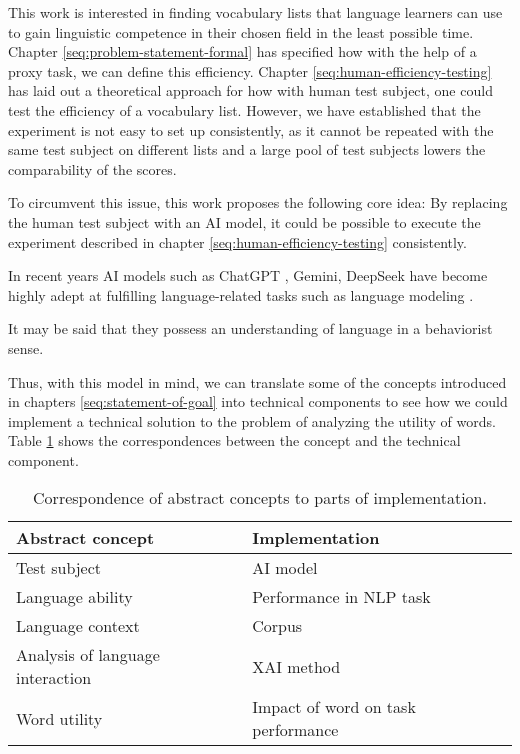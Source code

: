 This work is interested in finding vocabulary lists that language learners can use to gain linguistic competence in their chosen field in the least possible time.
Chapter \ref{seq:problem-statement-formal} has specified how with the help of a proxy task, we can define this efficiency.
Chapter \ref{seq:human-efficiency-testing} has laid out a theoretical approach for how with human test subject, one could test the efficiency of a vocabulary list.
However, we have established that the experiment is not easy to set up consistently, as it cannot be repeated with the same test subject on different lists and a large pool of test subjects lowers the comparability of the scores.

To circumvent this issue, this work proposes the following core idea:
By replacing the human test subject with an AI model, it could be possible to execute the experiment described in chapter \ref{seq:human-efficiency-testing} consistently.

In recent years AI models such as ChatGPT , Gemini, DeepSeek have become highly adept at fulfilling language-related tasks such as language modeling .

It may be said that they possess an understanding of language in a behaviorist sense.

Thus, with this model in mind, we can translate some of the concepts introduced in chapters \ref{seq:statement-of-goal} into technical components to see how we could implement a technical solution to the problem of analyzing the utility of words.
Table \ref{table:concept-implementation-correspondence} shows the correspondences between the concept and the technical component.

\begin{table}[ht]
	\centering
	\begin{tabularx}{\textwidth}{|X|X|}
		\hline
		\textbf{Abstract concept}        & \textbf{Implementation}            \\
		\hline
		Test subject                     & AI model                           \\
		\hline
		Language ability                 & Performance in NLP task            \\
		\hline
		Language context                 & Corpus                             \\
		\hline
		Analysis of language interaction & XAI method                         \\
		\hline
		Word utility                     & Impact of word on task performance \\
		\hline
	\end{tabularx}
	\caption{Correspondence of abstract concepts to parts of implementation.}
	\label{table:concept-implementation-correspondence}
\end{table}

